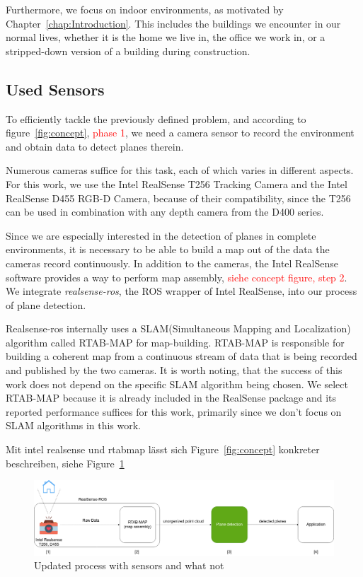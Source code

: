\documentclass[main.tex]{subfiles}
\begin{document}
Furthermore, we focus on indoor environments, as motivated by Chapter~\ref{chap:Introduction}.
This includes the buildings we encounter in our normal lives, whether it is the home we live in, the office we work in, or a stripped-down version of a building during construction.




\subsection{Used Sensors}
To efficiently tackle the previously defined problem, and according to figure~\ref{fig:concept}, \textcolor{red}{phase 1}, we need a camera sensor to record the environment and obtain data to detect planes therein.

Numerous cameras suffice for this task, each of which varies in different aspects.
For this work, we use the Intel RealSense T256 Tracking Camera and the Intel RealSense D455 RGB-D Camera, because of their compatibility, 
since the T256 can be used in combination with any depth camera from the D400 series.

Since we are especially interested in the detection of planes in complete environments, it is necessary to be able to build a map out of the data the cameras 
record continuously. 
In addition to the cameras, the Intel RealSense software provides a way to perform map assembly, \textcolor{red}{siehe concept figure, step 2}.
We integrate \textit{realsense-ros}, the ROS wrapper of Intel RealSense, into our process of plane detection.

Realsense-ros internally uses a SLAM(Simultaneous Mapping and Localization) algorithm called RTAB-MAP \cite{Labbé_Michaud_2019} for map-building.
RTAB-MAP is responsible for building a coherent map from a continuous stream of data that is being recorded and published by the two cameras.
It is worth noting, that the success of this work does not depend on the specific SLAM algorithm being chosen. We select RTAB-MAP because
it is already included in the RealSense package and its reported performance suffices for this work, primarily since we don't focus on SLAM
algorithms in this work. 

Mit intel realsense und rtabmap lässt sich Figure~\ref{fig:concept} konkreter beschreiben, siehe Figure~\ref{fig:concept_spec} 

\begin{figure}[!ht]
	\centering
	\includegraphics[width=15 cm]{images/concept_specific.png}
    \caption{Updated process with sensors and what not}
    \label{fig:concept_spec}
\end{figure}
\end{document}
